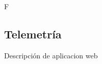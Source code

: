 \documentclass[journal]{IEEEtran}
\begin{document}
{\color{blue}F}


\subsection{Telemetría}
Descripción de aplicacion web
\newline








\end{document}
